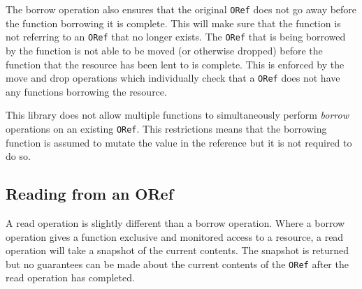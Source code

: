 \documentclass[onehalf,11pt]{beavtex}
\begin{document}
The borrow operation also ensures that the original \texttt{ORef} does not
go away before the function borrowing it is complete. This will make sure that
the function is not referring to an \texttt{ORef} that no longer exists.
The \texttt{ORef} that is being borrowed by the function is not able to be moved
(or otherwise dropped) before the function that the resource has been lent to is
complete. This is enforced by the move and drop operations which individually
check that a \texttt{ORef} does not have any functions borrowing the resource.

This library does not allow multiple functions to simultaneously perform
\textit{borrow} operations on an existing \texttt{ORef}.
This restrictions means that the borrowing function is assumed to mutate the
value in the reference but it is not required to do so.








\subsection{Reading from an ORef}

A read operation is slightly different than a borrow operation. Where a borrow
operation gives a function exclusive and monitored access to a resource, a read
operation will take a snapshot of the current contents. The snapshot is returned
but no guarantees can be made about the current contents of the \texttt{ORef}
after the read operation has completed.
\end{document}
